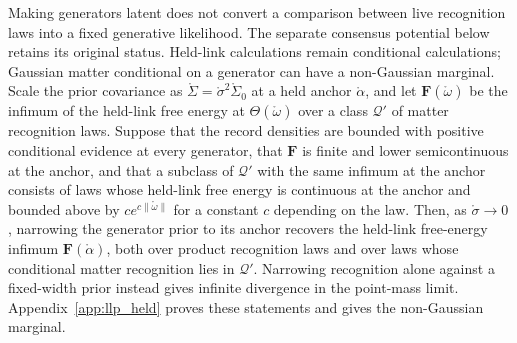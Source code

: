 Making generators latent does not convert a comparison between live recognition laws into a fixed generative likelihood. The separate consensus potential below retains its original status. Held-link calculations remain conditional calculations; Gaussian matter conditional on a generator can have a non-Gaussian marginal. Scale the prior covariance as $\mathring\Sigma=\mathring\sigma^2\mathring\Sigma_0$ at a held anchor $\mathring\alpha$, and let $\mathbf F(\mathring\omega)$ be the infimum of the held-link free energy at $\Theta(\mathring\omega)$ over a class $\mathcal Q'$ of matter recognition laws. Suppose that the record densities are bounded with positive conditional evidence at every generator, that $\mathbf F$ is finite and lower semicontinuous at the anchor, and that a subclass of $\mathcal Q'$ with the same infimum at the anchor consists of laws whose held-link free energy is continuous at the anchor and bounded above by $ce^{c\|\mathring\omega\|}$ for a constant $c$ depending on the law. Then, as $\mathring\sigma\to0$, narrowing the generator prior to its anchor recovers the held-link free-energy infimum $\mathbf F(\mathring\alpha)$, both over product recognition laws and over laws whose conditional matter recognition lies in $\mathcal Q'$. Narrowing recognition alone against a fixed-width prior instead gives infinite divergence in the point-mass limit. Appendix~\ref{app:llp_held} proves these statements and gives the non-Gaussian marginal.

